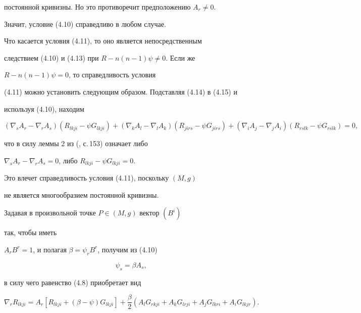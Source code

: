 постоянной кривизны. Но это противоречит предположению $A_r\ne 0$.


Значит, условие (4.10) справедливо в любом случае.





Что касается условия (4.11), то оно является непосредственным


следствием (4.10) и (4.13) при $R-n(n-1)\psi\ne 0$. Если же


$R-n(n-1)\psi=0$, то справедливость условия


(4.11) можно установить следующим образом. Подставляя (4.14) в (4.15) и


используя (4.10), находим


$$


(\nabla_s A_r-\nabla_r A_s)(R_{lkji}-\psi G_{lkji})+


(\nabla_k A_l-\nabla_l A_k)(R_{jirs}-\psi G_{jirs})+


(\nabla_i A_j-\nabla_j A_i)(R_{rslk}-\psi G_{rslk})=0,


$$


что в силу леммы 2 из (\cite{11}, с.\,153) означает либо


$\nabla_s A_r-\nabla_r A_s=0$, либо $R_{lkji}-\psi G_{lkji}=0$.


Это влечет справедливость условия (4.11), поскольку $(M,g)$


не является многообразием постоянной кривизны.





Задавая в произвольной точке $P\in(M,g)$ вектор $(B^i)$


так, чтобы иметь


$A_r B^r=1$, и полагая $\beta=\psi_r B^r$, получим из (4.10)


\begin{equation}


\psi_s=\beta A_s,\tag{4.29}


\end{equation}


в силу чего равенство (4.8) приобретает вид


\begin{equation}


\nabla_r R_{lkji}=A_r[R_{lkji}+(\beta-\psi)G_{lkji}]+


\frac{\beta}{2}(A_lG_{rkji}+A_kG_{lrji}+


A_jG_{lkri}+A_iG_{lkjr}).\tag{4.30}


\end{equation}





